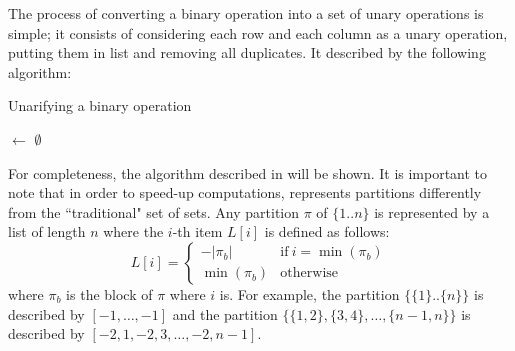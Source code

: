  The process of converting a binary operation into a set of unary operations is simple; it consists of considering each row and each column as a unary operation, putting them in list and removing all duplicates. It described by the following algorithm:\newline\newline

 \begin{algorithm}[H]
\label{unarify}
\DontPrintSemicolon
\caption{Unarifying a binary operation}

\BlankLine
\BlankLine
\unary $\leftarrow$ $\emptyset$\;
\Return{\unary}
\end{algorithm}\vspace{0.9em}
\newpage\noindent For completeness, the algorithm described in \cite{freese2008computing} will be shown. It is important to note that in order to speed-up computations, \cite{freese2008computing} represents partitions differently from the ``traditional" set of sets. \newline Any partition $\pi$ of $\{1..n\}$ is represented by a list of length $n$ where the $i$-th item $L[i]$ is defined as follows:\newline 
\[L[i] = \begin{cases} 
      -|\pi_b| & \text{if}~i=\min{(\pi_b)}\\
      \min{(\pi_b)} & \text{otherwise}
   \end{cases}\] where $\pi_b$ is the block of $\pi$ where $i$ is.\newline 
\noindent For example, the partition $\{\{1\}..\{n\}\}$ is described by $[-1,\dots,-1]$ and the partition $\{\{1,2\}, \{3,4\},\dots,\{n-1, n\}\}$ is described by $[-2,1,-2,3,\dots, -2, n-1]$.\newline


